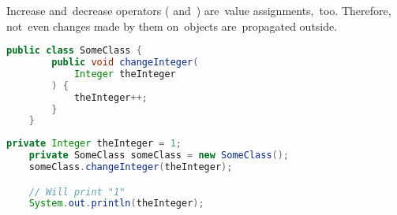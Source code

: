 \note Increase and~decrease operators (\mbitq{++} \mbox{and \itq{-{}-}}) are~value assignments,~too.
Therefore, not~even changes made by them on~objects are~propagated outside.

\begin{lstlisting}[language=Java, title={Class with method changing increasing \textit{Integer} instance}]
    public class SomeClass {
        public void changeInteger(
            Integer theInteger
        ) {
            theInteger++;
        }
    }
\end{lstlisting}
\begin{lstlisting}[language=Java, title={Behavior}]
    private Integer theInteger = 1;
    private SomeClass someClass = new SomeClass();
    someClass.changeInteger(theInteger);

    // Will print "1"
    System.out.println(theInteger);
\end{lstlisting}
